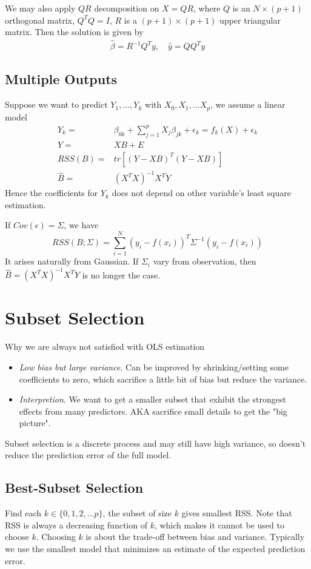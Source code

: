 We may also apply $QR$ decomposition on $X=QR$, where $Q$ is an $N\times (p+1)$ 
orthogonal matrix, $Q^TQ=I$, $R$ is a $(p+1)\times (p+1)$ upper triangular matrix. 
Then the solution is given by
\begin{align*}
\hat{\beta}=R^{-1}Q^Ty,\quad \hat{y}=QQ^Ty
\end{align*}

\subsection{Multiple Outputs}
Suppose we want to predict $Y_1,...,Y_k$ with $ X_0,X_1,...X_p $, we assume a linear model
\begin{align*}
Y_k=&\beta_{0k}+\sum_{j=1}^pX_j\beta_{jk}+\epsilon_k=f_k(X)+\epsilon_k\\
Y=&XB+E\\
RSS(B)=&tr[(Y-XB)^T(Y-XB)]\\
\hat{B}=&(X^TX)^{-1}X^TY
\end{align*}
Hence the coefficients for $Y_k$ does not depend on other variable's least square estimation. 

If $Cov(\epsilon)=\Sigma$, we have
\begin{equation*}
RSS(B;\Sigma)=\sum_{i=1}^N(y_i-f(x_i))^T\Sigma^{-1}(y_i-f(x_i))
\end{equation*}
It arises naturally from Gaussian. If $\Sigma_i$ vary from observation, then 
$\hat{B}=(X^TX)^{-1}X^TY$ is no longer the case. 

\section{Subset Selection}
Why we are always not satisfied with OLS estimation
\begin{itemize}
\item \textit{Low bias but large variance}. Can be improved by shrinking/setting some coefficients
to zero, which sacrifice a little bit of bias but reduce the variance. 
\item \textit{Interpretion}. We want to get a smaller subset that exhibit the strongest
effects from many predictors. AKA sacrifice small details to get the "big picture". 
\end{itemize}
Subset selection is a discrete process and may still have high variance, so doesn't
reduce the prediction error of the full model. 
\subsection{Best-Subset Selection}
Find each $k\in\{0,1,2,...p\}$, the subset of size $k$ gives smallest RSS. Note that
RSS is always a decreasing function of $k$, which makes it cannot be used to choose
$k$. Choosing $k$ is about the trade-off between bias and variance. Typically we use 
the smallest model that minimizes an estimate of the expected prediction error. 
